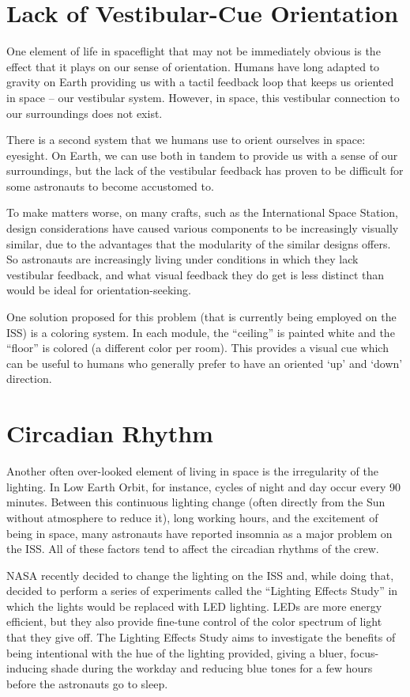 \documentclass{article}
\begin{document}
  \section{Lack of Vestibular-Cue Orientation}

  One element of life in spaceflight that may not be immediately obvious is the effect that it plays on our sense of orientation. Humans have long adapted to gravity on Earth providing us with a tactil feedback loop that keeps us oriented in space -- our vestibular system. However, in space, this vestibular connection to our surroundings does not exist. 

  There is a second system that we humans use to orient ourselves in space: eyesight. On Earth, we can use both in tandem to provide us with a sense of our surroundings, but the lack of the vestibular feedback has proven to be difficult for some astronauts to become accustomed to.

  To make matters worse, on many crafts, such as the International Space Station, design considerations have caused various components to be increasingly visually similar, due to the advantages that the modularity of the similar designs offers. So astronauts are increasingly living under conditions in which they lack vestibular feedback, and what visual feedback they do get is less distinct than would be ideal for orientation-seeking.

  One solution proposed for this problem (that is currently being employed on the ISS) is a coloring system. In each module, the ``ceiling'' is painted white and the ``floor'' is colored (a different color per room). This provides a visual cue which can be useful to humans who generally prefer to have an oriented `up' and `down' direction.\cite{novak2}

  \section{Circadian Rhythm}

  Another often over-looked element of living in space is the irregularity of the lighting. In Low Earth Orbit, for instance, cycles of night and day occur every 90 minutes. Between this continuous lighting change (often directly from the Sun without atmosphere to reduce it), long working hours, and the excitement of being in space, many astronauts have reported insomnia as a major problem on the ISS. All of these factors tend to affect the circadian rhythms of the crew.

  NASA recently decided to change the lighting on the ISS and, while doing that, decided to perform a series of experiments called the ``Lighting Effects Study'' in which the lights would be replaced with LED lighting\cite{lockley}. LEDs are more energy efficient, but they also provide fine-tune control of the color spectrum of light that they give off. The Lighting Effects Study aims to investigate the benefits of being intentional with the hue of the lighting provided, giving a bluer, focus-inducing shade during the workday and reducing blue tones for a few hours before the astronauts go to sleep.
\end{document}
